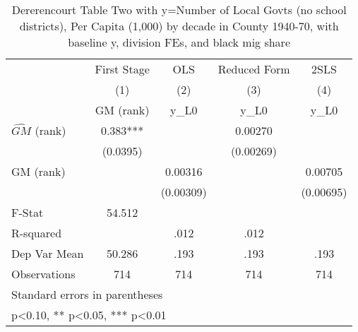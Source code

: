 \begin{table}[htbp]\centering
\def\sym#1{\ifmmode^{#1}\else\(^{#1}\)\fi}
\caption{Dererencourt Table Two with y=Number of Local Govts (no school districts), Per Capita (1,000) by decade in County 1940-70, with baseline y, division FEs, and black mig share}
\begin{tabular}{l*{4}{c}}
\toprule
                    & First Stage   &         OLS   &Reduced Form   &        2SLS   \\
                    &\multicolumn{1}{c}{(1)}&\multicolumn{1}{c}{(2)}&\multicolumn{1}{c}{(3)}&\multicolumn{1}{c}{(4)}\\
                    &\multicolumn{1}{c}{GM  (rank)}&\multicolumn{1}{c}{y\_L0}&\multicolumn{1}{c}{y\_L0}&\multicolumn{1}{c}{y\_L0}\\
\midrule
$\hat{GM}$ (rank)   &       0.383***&               &     0.00270   &               \\
                    &    (0.0395)   &               &   (0.00269)   &               \\
\addlinespace
GM  (rank)          &               &     0.00316   &               &     0.00705   \\
                    &               &   (0.00309)   &               &   (0.00695)   \\
\midrule
F-Stat              &      54.512   &               &               &               \\
R-squared           &               &        .012   &        .012   &               \\
Dep Var Mean        &      50.286   &        .193   &        .193   &        .193   \\
Observations        &         714   &         714   &         714   &         714   \\
\bottomrule
\multicolumn{5}{l}{\footnotesize Standard errors in parentheses}\\
\multicolumn{5}{l}{\footnotesize * p<0.10, ** p<0.05, *** p<0.01}\\
\end{tabular}
\end{table}

